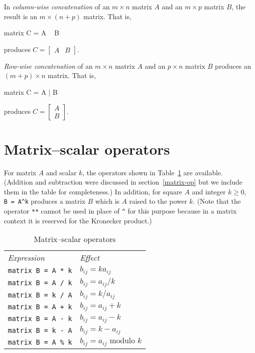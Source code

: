 In \textit{column-wise concatenation} of an $m\times n$ matrix $A$ and
an $m\times p$ matrix $B$, the result is an $m\times (n+p)$ matrix.
That is,
%
\begin{code}
matrix C = A ~ B
\end{code}
% 
produces $C = \left[ \begin{array}{cc} A & B \end{array} \right]$.

\textit{Row-wise concatenation} of an $m\times n$ matrix $A$ and
an $p\times n$ matrix $B$ produces an $(m+p) \times n$ matrix.
That is,
%
\begin{code}
matrix C = A | B
\end{code}
% 
produces $C = \left[ \begin{array}{cc} A \\ B \end{array} \right]$.

\section{Matrix--scalar operators}
\label{matrix-scalar-op}

For matrix $A$ and scalar $k$, the operators shown in
Table~\ref{tab:matrix-scalar-ops} are available.  (Addition and
subtraction were discussed in section~\ref{matrix-op} but we include
them in the table for completeness.)  In addition, for square $A$ and
integer $k \geq 0$, \verb|B = A^k| produces a matrix $B$ which is $A$
raised to the power $k$.  (Note that the operator \texttt{**} cannot
be used in place of \verb|^| for this purpose because in a matrix
context it is reserved for the Kronecker product.)

\begin{table}[htbp]
\centering
\begin{tabular}{ll}
\textit{Expression} & \textit{Effect} \\[4pt]
\texttt{matrix B = A * k} & $b_{ij} = k a_{ij}$ \\
\texttt{matrix B = A / k} & $b_{ij} = a_{ij} / k$ \\
\texttt{matrix B = k / A} & $b_{ij} = k / a_{ij}$ \\
\texttt{matrix B = A + k} & $b_{ij} = a_{ij} + k$ \\
\texttt{matrix B = A - k} & $b_{ij} = a_{ij} - k$ \\
\texttt{matrix B = k - A} & $b_{ij} = k - a_{ij}$ \\
\texttt{matrix B = A \% k} & $b_{ij} = a_{ij} \mbox{ modulo } k$ \\
\end{tabular}
\caption{Matrix--scalar operators}
\label{tab:matrix-scalar-ops}
\end{table}


